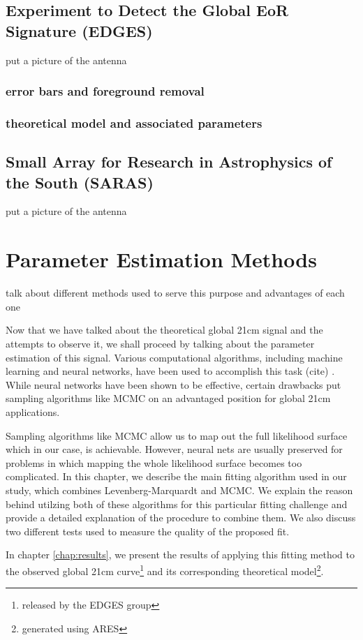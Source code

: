 \documentclass[12pt, TexShade, letterpaper]{report}
\begin{document}
\section{Experiment to Detect the Global EoR Signature (EDGES)}
put a picture of the antenna
\subsection{error bars and foreground removal}
\subsection{theoretical model and associated parameters}
\section{Small Array for Research in Astrophysics of the South (SARAS)}
put a picture of the antenna
\chapter{Parameter Estimation Methods}
\label{chap:method}
talk about different methods used to serve this purpose and advantages of each one\par
Now that we have talked about the theoretical global 21cm signal and the attempts to observe it, we shall proceed by talking about the parameter estimation of this signal. Various computational algorithms, including machine learning and neural networks, have been used to accomplish this task (cite) . While neural networks have been shown to be effective, certain drawbacks  put sampling algorithms like MCMC on an advantaged position for global 21cm applications.\par
Sampling algorithms like MCMC allow us to map out the full likelihood surface which in our case, is achievable. However, neural nets are usually preserved for problems in which mapping the whole likelihood surface  becomes too complicated.
In this chapter, we describe the main fitting algorithm used in our study, which combines Levenberg-Marquardt and MCMC. We explain the reason behind utilzing both of these algorithms for this particular fitting challenge and provide a detailed explanation of the procedure to combine them. We also discuss two different tests used to measure the quality of the proposed fit.\par
In chapter \ref{chap:results}, we present the results of applying this fitting method to the observed global 21cm curve\footnote{released by the EDGES group} and its corresponding theoretical model\footnote{generated using ARES}.
\end{document}
